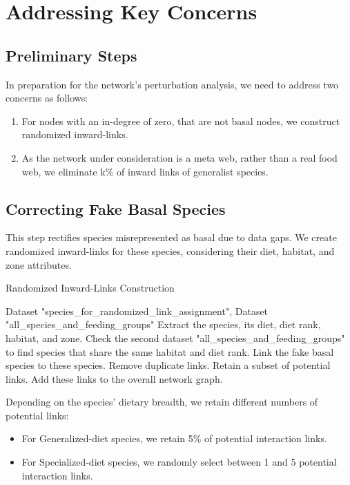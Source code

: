 \documentclass[a4paper, 12pt]{report}
\begin{document}
\chapter{Addressing Key Concerns}

\section{Preliminary Steps}
In preparation for the network's perturbation analysis, we need to address two concerns as follows:
\begin{enumerate}
\item For nodes with an in-degree of zero, that are not basal nodes, we construct randomized inward-links.
\item As the network under consideration is a meta web, rather than a real food web, we eliminate k\% of inward links of generalist species.
\end{enumerate}

\section{Correcting Fake Basal Species}
This step rectifies species misrepresented as basal due to data gaps. We create randomized inward-links for these species, considering their diet, habitat, and zone attributes.

\begin{algorithm}
    \caption{Randomized Inward-Links Construction}
    \begin{algorithmic}[1]
    \small
    \Require Dataset "species\_for\_randomized\_link\_assignment", Dataset "all\_species\_and\_feeding\_groups"
        \State Extract the species, its diet, diet rank, habitat, and zone.
        \State Check the second dataset "all\_species\_and\_feeding\_groups" to find species that share the same habitat and diet rank. 
        \State Link the fake basal species to these species.
        \State Remove duplicate links.
        \State Retain a subset of potential links.
        \State Add these links to the overall network graph.
    \EndFor
    \end{algorithmic}
\end{algorithm}
Depending on the species' dietary breadth, we retain different numbers of potential links:

\begin{itemize}
\item For Generalized-diet species, we retain 5\% of potential interaction links.
\item For Specialized-diet species, we randomly select between 1 and 5 potential interaction links.
\end{itemize}
\end{document}
